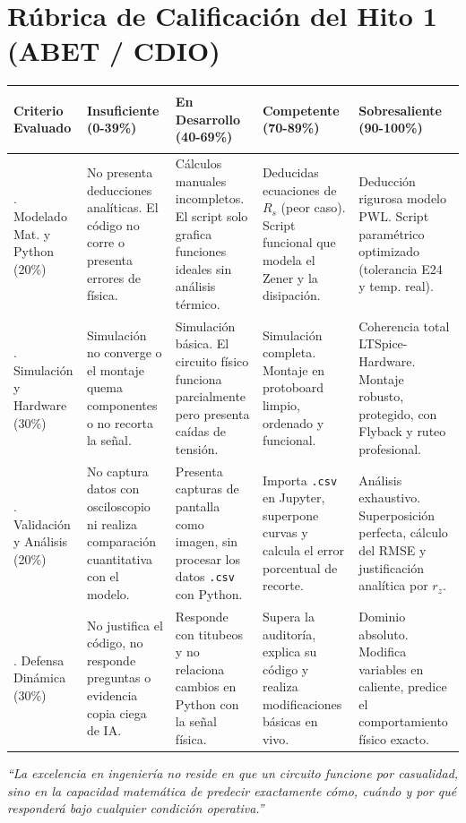 \documentclass[11pt, a4paper]{article}
\begin{document}
\section{Rúbrica de Calificación del Hito 1 (ABET / CDIO)}

\begin{table}[h!]
\centering
\footnotesize
\renewcommand{\arraystretch}{1.5}
\begin{tabularx}{\textwidth}{@{} >{\bfseries\raggedright\arraybackslash}p{2.8cm} *{4}{>{\raggedright\arraybackslash}X} @{}}
\toprule
Criterio Evaluado & Insuficiente (0-39\%) & En Desarrollo (40-69\%) & Competente (70-89\%) & Sobresaliente (90-100\%) \\
\midrule
1. Modelado Mat. y Python (20\%) & 
No presenta deducciones analíticas. El código no corre o presenta errores de física. & 
Cálculos manuales incompletos. El script solo grafica funciones ideales sin análisis térmico. & 
Deducidas ecuaciones de $R_s$ (peor caso). Script funcional que modela el Zener y la disipación. & 
Deducción rigurosa modelo PWL. Script paramétrico optimizado (tolerancia E24 y temp. real). \\

2. Simulación y Hardware (30\%) & 
Simulación no converge o el montaje quema componentes o no recorta la señal. & 
Simulación básica. El circuito físico funciona parcialmente pero presenta caídas de tensión. & 
Simulación completa. Montaje en protoboard limpio, ordenado y funcional. & 
Coherencia total LTSpice-Hardware. Montaje robusto, protegido, con Flyback y ruteo profesional. \\

3. Validación y Análisis (20\%) & 
No captura datos con osciloscopio ni realiza comparación cuantitativa con el modelo. & 
Presenta capturas de pantalla como imagen, sin procesar los datos \texttt{.csv} con Python. & 
Importa \texttt{.csv} en Jupyter, superpone curvas y calcula el error porcentual de recorte. & 
Análisis exhaustivo. Superposición perfecta, cálculo del RMSE y justificación analítica por $r_z$. \\

4. Defensa Dinámica (30\%) & 
No justifica el código, no responde preguntas o evidencia copia ciega de IA. & 
Responde con titubeos y no relaciona cambios en Python con la señal física. & 
Supera la auditoría, explica su código y realiza modificaciones básicas en vivo. & 
Dominio absoluto. Modifica variables en caliente, predice el comportamiento físico exacto. \\
\bottomrule
\end{tabularx}
\end{table}

\vspace{0.4cm}
\begin{cita}
\textit{``La excelencia en ingeniería no reside en que un circuito funcione por casualidad, sino en la capacidad matemática de predecir exactamente cómo, cuándo y por qué responderá bajo cualquier condición operativa.''}
\end{cita}
\end{document}
